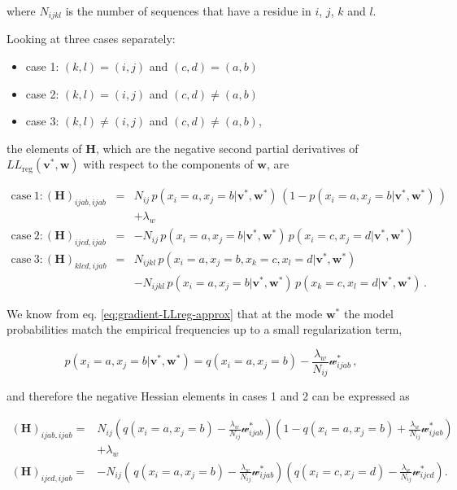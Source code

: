 \documentclass[12pt,a4paper,twoside]{book}
\providecommand{\tightlist}{%
  \setlength{\itemsep}{0pt}\setlength{\parskip}{0pt}}
\newcommand{\eq}{\!=\!}
\renewcommand{\H}{\mathbf{H}}
\newcommand{\LLreg}{L\!L_\mathrm{reg}}
\renewcommand{\v}{\mathbf{v}}
\newcommand{\w}{\mathbf{w}}
\newcommand{\wijab}{\mathcal{w}_{ijab}}
\newcommand{\wijcd}{\mathcal{w}_{ijcd}}
\theoremstyle{definition}
\theoremstyle{definition}
\theoremstyle{remark}
\begin{document}
where \(N_{ijkl}\) is the number of sequences that have a residue in
\(i\), \(j\), \(k\) and \(l\).

Looking at three cases separately:

\begin{itemize}
\tightlist
\item
  case 1: \((k,l) = (i,j)\) and \((c,d) = (a,b)\)
\item
  case 2: \((k,l) = (i,j)\) and \((c,d) \ne (a,b)\)
\item
  case 3: \((k,l) \ne (i,j)\) and \((c,d) \ne (a,b)\),
\end{itemize}

the elements of \(\H\), which are the negative second partial
derivatives of \(\LLreg(\v^*,\w)\) with respect to the components of
\(\w\), are

\begin{eqnarray}
    \mathrm{case~1:} (\H)_{ijab, ijab}  
    &=&  N_{ij} \, p(x_i \eq a, x_j \eq b| \v^*,\w^*) \, ( 1 - p(x_i \eq a, x_j \eq b| \v^*,\w^*) \,) \\
    &&   + \lambda_w \\
    \mathrm{case~2:} (\H)_{ijcd, ijab}  
    &=&  - N_{ij} \, p(x_i \eq a, x_j \eq b |\v^*,\w^*) \, p(x_i \eq c, x_j \eq d |\v^*,\w^*) \\
    \mathrm{case~3:} (\H)_{klcd, ijab}  
    &=&   N_{ijkl} \, p(x_i \eq a, x_j \eq b, x_k \eq c, x_l \eq d  | \v^*,\w^*) \nonumber \\
    &&    - N_{ijkl} \, p(x_i \eq a, x_j \eq b | \v^*,\w^*)\, p(x_k \eq c, x_l \eq d | \v^*,\w^*) \,.
\label{eq:Hw-offdiag}
\end{eqnarray}

We know from eq. \eqref{eq:gradient-LLreg-approx} that at the mode
\(\w^*\) the model probabilities match the empirical frequencies up to a
small regularization term,

\begin{equation}
    p(x_i \eq a, x_j \eq b | \v^*,\w^*) = q(x_i \eq a, x_j \eq b) - \frac{\lambda_w}{N_{ij}}  \wijab^* \,,
\end{equation}

and therefore the negative Hessian elements in cases 1 and 2 can be
expressed as

\begin{align}
   (\H)_{ijab, ijab} =& N_{ij} \left( q(x_i \eq a, x_j \eq b)  - \frac{\lambda_w}{N_{ij}} \wijab^* \right) \left( 1 - q(x_i \eq a, x_j \eq b) +\frac{\lambda_w}{N_{ij}} \wijab^* \right) \\
   & + \lambda_w \\
   (\H)_{ijcd, ijab} =& -N_{ij} \left(\,q(x_i \eq a, x_j \eq b)  - \frac{\lambda_w}{N_{ij}} \wijab^* \right) \left( q(x_i \eq c, x_j \eq d) -\frac{\lambda_w}{N_{ij}} \wijcd^* \right) .
\label{eq:Hw-diag}
\end{align}
\end{document}
